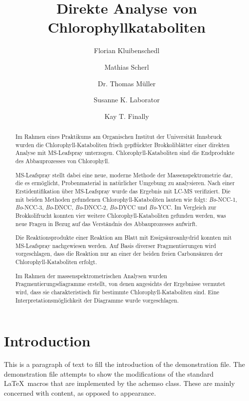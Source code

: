 \documentclass[journal=jacsat,manuscript=article]{achemso}
\author{Florian Kluibenschedl}
\author{Mathias Scherl}
\author{Dr. Thomas Müller}
\affiliation[Unknown University]
{Department of Chemistry, Unknown University, Unknown Town}
\author{Susanne K. Laborator}
\affiliation[BigPharma]
{Lead Discovery, BigPharma, Big Town, USA}
\author{Kay T. Finally}
\affiliation[Unknown University]
{Department of Chemistry, Unknown University, Unknown Town}
\title[VWA im Bereich Chemie]
  {Direkte Analyse von Chlorophyllkataboliten}
\begin{document}
\begin{abstract}
  Im Rahmen eines Praktikums am Organischen Institut der Universität Innsbruck wurden die Chlorophyll-Kataboliten frisch gepflückter Brokkoliblätter einer direkten Analyse mit MS-Leafspray unterzogen. Chlorophyll-Kataboliten sind die Endprodukte des Abbauprozesses von Chlorophyll.

MS-Leafspray stellt dabei eine neue, moderne Methode der Massenspektrometrie dar, die es ermöglicht, Probenmaterial in natürlicher Umgebung zu analysieren. Nach einer Erstidentifikation über MS-Leafspray wurde das Ergebnis mit LC-MS verifiziert. Die mit beiden Methoden gefundenen Chlorophyll-Kataboliten lauten wie folgt: \textit{Bo}-NCC-1, \textit{Bo}-NCC-3, \textit{Bo}-DNCC, \textit{Bo}-DNCC-2, \textit{Bo}-DYCC und \textit{Bo}-YCC. Im Vergleich zur Brokkolifrucht konnten vier weitere Chlorophyll-Kataboliten gefunden werden, was neue Fragen in Bezug auf das Verständnis des Abbauprozesses aufwirft. 

Die Reaktionsprodukte einer Reaktion am Blatt mit Essigsäureanhydrid konnten mit MS-Leafspray nachgewiesen werden. Auf Basis diverser Fragmentierungen wird vorgeschlagen, dass die Reaktion nur an einer der beiden freien Carbonsäuren der Chlorophyll-Kataboliten erfolgt. 

Im Rahmen der massenspektrometrischen Analysen wurden Fragmentierungsdiagramme erstellt, von denen angesichts der Ergebnisse vermutet wird, dass sie charakteristisch für bestimmte Chlorophyll-Kataboliten sind. Eine Interpretationsmöglichkeit der Diagramme wurde vorgeschlagen. 
\end{abstract}

\section{Introduction}
This is a paragraph of text to fill the introduction of the
demonstration file.  The demonstration file attempts to show the
modifications of the standard \LaTeX\ macros that are implemented by
the \textsf{achemso} class.  These are mainly concerned with content,
as opposed to appearance.\citep{MassSpectrometry}
\end{document}
